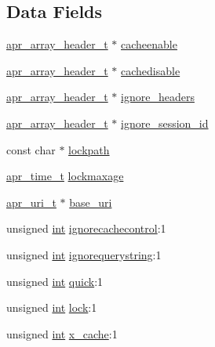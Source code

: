 \subsection*{Data Fields}
\begin{DoxyCompactItemize}
\item 
\hyperlink{structapr__array__header__t}{apr\+\_\+array\+\_\+header\+\_\+t} $\ast$ \hyperlink{structcache__server__conf_aaa7a7b0ab522f181bde5376c2673a9b4}{cacheenable}
\item 
\hyperlink{structapr__array__header__t}{apr\+\_\+array\+\_\+header\+\_\+t} $\ast$ \hyperlink{structcache__server__conf_a5cb017668213d1850a5b145f111ae4d1}{cachedisable}
\item 
\hyperlink{structapr__array__header__t}{apr\+\_\+array\+\_\+header\+\_\+t} $\ast$ \hyperlink{structcache__server__conf_a4e8983b6a8e6aa3777b6c49844d75faa}{ignore\+\_\+headers}
\item 
\hyperlink{structapr__array__header__t}{apr\+\_\+array\+\_\+header\+\_\+t} $\ast$ \hyperlink{structcache__server__conf_a71f98f488db59936317ef657edfe8653}{ignore\+\_\+session\+\_\+id}
\item 
const char $\ast$ \hyperlink{structcache__server__conf_ab8f9316567111d3366fcc1edfaf0bc8c}{lockpath}
\item 
\hyperlink{group__apr__time_gadb4bde16055748190eae190c55aa02bb}{apr\+\_\+time\+\_\+t} \hyperlink{structcache__server__conf_a4a1fb68d2fc7f123fc7bc5c3d19f1f7d}{lockmaxage}
\item 
\hyperlink{structapr__uri__t}{apr\+\_\+uri\+\_\+t} $\ast$ \hyperlink{structcache__server__conf_a0700dd05df7773ace8d69b1cb71d85ed}{base\+\_\+uri}
\item 
unsigned \hyperlink{pcre_8txt_a42dfa4ff673c82d8efe7144098fbc198}{int} \hyperlink{structcache__server__conf_a2372aa3f5b681975bd629bb1c865735d}{ignorecachecontrol}\+:1
\item 
unsigned \hyperlink{pcre_8txt_a42dfa4ff673c82d8efe7144098fbc198}{int} \hyperlink{structcache__server__conf_a120515fffd1d3598dfd49107c9f67de9}{ignorequerystring}\+:1
\item 
unsigned \hyperlink{pcre_8txt_a42dfa4ff673c82d8efe7144098fbc198}{int} \hyperlink{structcache__server__conf_a9fcfca4177da5400a75f607f5d808b93}{quick}\+:1
\item 
unsigned \hyperlink{pcre_8txt_a42dfa4ff673c82d8efe7144098fbc198}{int} \hyperlink{structcache__server__conf_ab459a77dbc1bbba26a954336d34d136e}{lock}\+:1
\item 
unsigned \hyperlink{pcre_8txt_a42dfa4ff673c82d8efe7144098fbc198}{int} \hyperlink{structcache__server__conf_a0de4dc2e226700211b9a0ef82c9823c5}{x\+\_\+cache}\+:1

\end{DoxyCompactItemize}

